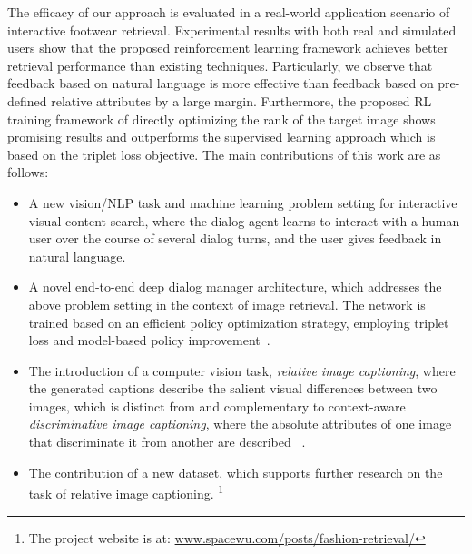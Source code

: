 The efficacy of our approach is evaluated in a real-world application
scenario of interactive footwear retrieval. Experimental results with both 
real and simulated users show that the proposed reinforcement learning
framework achieves better retrieval performance than existing techniques. 
Particularly, we observe that feedback based on natural language is 
more effective than feedback based on pre-defined relative attributes by a large
margin. Furthermore, the proposed RL training framework of directly optimizing 
the rank of the target image shows promising results and outperforms the supervised learning approach which is based on the triplet loss objective. 
The main contributions of this work are as follows:
\begin{itemize}
\item A new vision/NLP task and machine learning problem setting for interactive visual content search, where the dialog agent learns to interact with a human user over the course of several dialog turns, and the user gives feedback in natural language. 
\item A novel end-to-end deep dialog manager architecture, which addresses the above problem setting in the context of image retrieval. The network is trained based on an efficient policy optimization strategy,
employing triplet loss and model-based policy improvement~\cite{sutton1998reinforcement}.
\item The introduction of a 
computer vision task, \emph{relative image captioning}, 
where the generated captions describe the salient visual differences between two images, which is distinct from and complementary to context-aware \emph{discriminative image captioning}, where the absolute attributes of one image that discriminate it from another are described ~\cite{vedantam2017}.
\item The contribution of a new dataset, which supports further research on the task of relative image captioning. \footnote{The project website is at: \url{www.spacewu.com/posts/fashion-retrieval/}}
\end{itemize}



